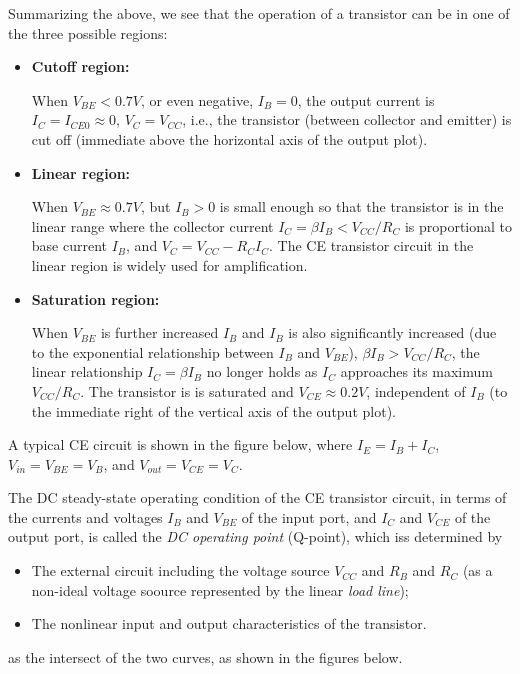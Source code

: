 Summarizing the above, we see that the operation of a transistor can be in 
one of the three possible regions:
\begin{itemize}
\item {\bf Cutoff region:} 

  When $V_{BE}<0.7V$, or even negative, $I_B=0$, the output current is
  $I_C=I_{CE0} \approx 0$, $V_C=V_{CC}$, i.e., the transistor (between 
  collector and emitter) is cut off (immediate above the horizontal
  axis of the output plot).

\item {\bf Linear region:} 

  When $V_{BE}\approx 0.7V$, but $I_B>0$ is small enough so that the 
  transistor is in the linear range where the collector current 
  $I_C=\beta I_B < V_{CC}/R_C$ is proportional to base current $I_B$, 
  and $V_C=V_{CC}-R_CI_C$. The CE transistor circuit in the linear 
  region is widely used for amplification.

\item {\bf Saturation region:} 

  When $V_{BE}$ is further increased $I_B$ and $I_B$ is also significantly
  increased (due to the exponential relationship between $I_B$ and $V_{BE}$), 
  $\beta I_B > V_{CC}/R_C$, the linear relationship $I_C=\beta I_B$ no longer 
  holds as $I_C$ approaches its maximum $V_{CC}/R_C$. The transistor is 
  is saturated and $V_{CE}\approx 0.2V$, independent of $I_B$ (to the 
  immediate right of the vertical axis of the output plot).

\end{itemize}

A typical CE circuit is shown in the figure below, where $I_E=I_B+I_C$,
$V_{in}=V_{BE}=V_B$, and $V_{out}=V_{CE}=V_C$.


The DC steady-state operating condition of the CE transistor circuit,
in terms of the currents and voltages $I_B$ and $V_{BE}$ of the input 
port, and $I_C$ and $V_{CE}$ of the output port, is called the 
{\em DC operating point} (Q-point), which iss determined by 
\begin{itemize}
\item The external circuit including the voltage source $V_{CC}$ 
  and $R_B$ and $R_C$ (as a non-ideal voltage soource represented 
  by the linear {\em load line});

\item The nonlinear input and output characteristics of the transistor.
\end{itemize}
as the intersect of the two curves, as shown in the figures below.

